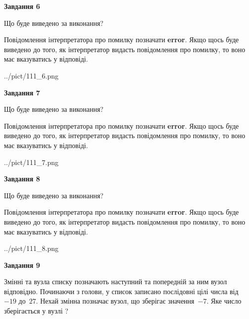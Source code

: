 \documentclass[12pt, ukrainian]{article}
\begin{document}
{\begin {large}
{\begin {center}\textbf{Завдання 6}\end {center}}\par
Що буде виведено за виконання?

Повідомлення інтерпретатора про помилку позначати \textbf{error}.
Якщо щось буде виведено до того, як інтерпретатор видасть повідомлення про помилку, 
то воно має вказуватись у відповіді. \par


\begin{center}
	{../pict/111_6.png}
\end{center}
\newpage

{\begin {center}\textbf{Завдання 7}\end {center}}\par
Що буде виведено за виконання?

Повідомлення інтерпретатора про помилку позначати \textbf{error}.
Якщо щось буде виведено до того, як інтерпретатор видасть повідомлення про помилку, 
то воно має вказуватись у відповіді. \par


\begin{center}
	{../pict/111_7.png}
\end{center}
\newpage

{\begin {center}\textbf{Завдання 8}\end {center}}\par
Що буде виведено за виконання?

Повідомлення інтерпретатора про помилку позначати \textbf{error}.
Якщо щось буде виведено до того, як інтерпретатор видасть повідомлення про помилку, 
то воно має вказуватись у відповіді. \par


\begin{center}
	{../pict/111_8.png}
\end{center}
\newpage

{\begin {center}\textbf{Завдання 9}\end {center}}\par
Змінні  та  вузла списку позначають наступний та попередній за ним вузол відповідно. Починаючи з голови, у список записано послідовні цілі числа від~$-19$ до~$27$. Нехай змінна  позначає вузол, що зберігає значення~$-7$.
Яке число зберігається у вузлі  ?\par
\newpage


\end{large}}
\end{document}
